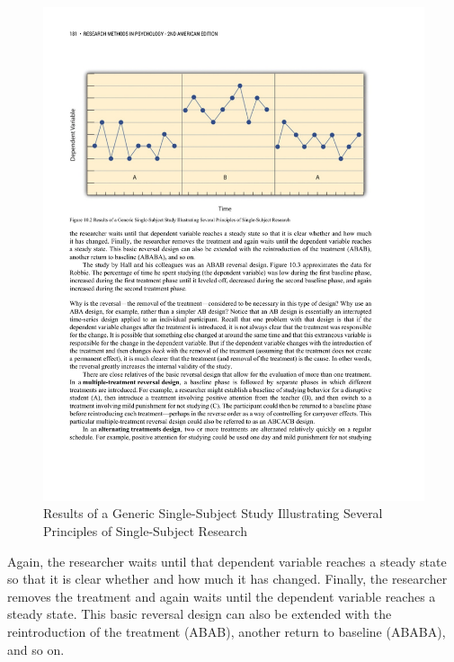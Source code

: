 \begin{figure}




\includegraphics[width=\linewidth]{figures/C10reverse.pdf}




\caption{Results of a Generic Single-Subject Study Illustrating Several Principles of Single-Subject Research
  }




\label{fig:reverse}




\end{figure}

Again,
the researcher waits until that dependent variable reaches a steady state so that it is clear whether and how much it has changed. Finally, the researcher removes the treatment and again waits until the dependent variable reaches a steady state. This basic reversal design can also be extended with the reintroduction of the treatment (ABAB), another return to baseline (ABABA), and so on.

